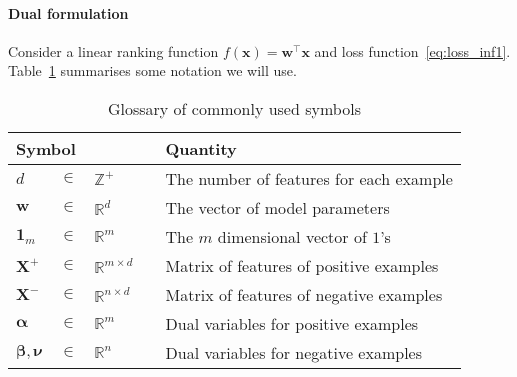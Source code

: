 \documentclass[9pt]{extarticle}
\newcommand{\x}{\mathbf{x}}
\newcommand{\1}{\mathbf{1}}
\newcommand{\w}{\mathbf{w}}
\newcommand{\X}{\mathbf{X}}
\newcommand{\R}{\mathbb{R}}
\newcommand{\Z}{\mathbb{Z}}
\newcommand{\alphabm}{\bm{\alpha}}
\newcommand{\betabm}{\bm{\beta}}
\newcommand{\nubm}{\bm{\nu}}
\begin{document}
\paragraph{Dual formulation}
Consider a linear ranking function $f(\x) = \w^\top \x$ and loss function~\ref{eq:loss_inf1}.
Table~\ref{tab:symbol} summarises some notation we will use.
\begin{table}[!h]
\caption{Glossary of commonly used symbols}
\label{tab:symbol}
\renewcommand{\arraystretch}{1.5} %
\setlength{\tabcolsep}{1pt} %
\centering
\begin{tabular}{llll}
\hline \hline
\multicolumn{3}{l}{\textbf{Symbol}} & \textbf{Quantity} \\ \hline 
$d$              &  $\in$  &  $\Z^+$  & The number of features for each example \\
$\w$             &  $\in$  &  $\R^d$  & The vector of model parameters \\
$\mathbf{1}_m$   &  $\in$  &  $\R^m$  & The $m$ dimensional vector of $1$'s \\
$\X^+$           &  $\in$  &  $\R^{m \times d}\quad$  & Matrix of features of positive examples \\
$\X^-$           &  $\in$  &  $\R^{n \times d}$       & Matrix of features of negative examples \\
$\alphabm$       &  $\in$  &  $\R^m$  &  Dual variables for positive examples \\
$\betabm, \nubm$ &  $\in$  &  $\R^n$  &  Dual variables for negative examples \\ \hline
\end{tabular}
\end{table}
\end{document}
